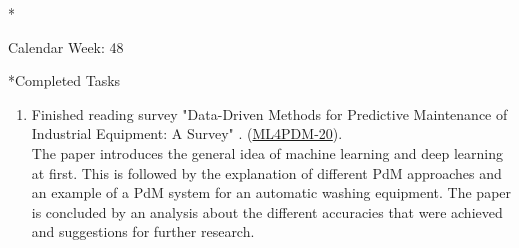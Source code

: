 \documentclass[11pt,a4paper]{article}
\begin{document}
\newpage
\begin{section}*{Calendar Week: 48 \hfill \date{27 November, 2020}}
 \begin{refsection}

   \begin{subsection}*{Completed Tasks}
     \begin{enumerate}
       \item
             Finished reading survey "Data-Driven Methods for Predictive Maintenance of Industrial Equipment: A Survey" \cite{DBLP:journals/sj/ZhangYW19}. (\href{https://ml4pdm.atlassian.net/browse/ML4PDM-20}{ML4PDM-20}).\\
             \phantom\quad The paper introduces the general idea of machine learning and deep learning at first. This is followed by the explanation of different PdM approaches and an example of a PdM system for an automatic washing equipment. The paper is concluded by an analysis about the different accuracies that were achieved and suggestions for further research.
     \end{enumerate}
   \end{subsection}

   \printbibliography
 \end{refsection}
\end{section}
\end{document}
